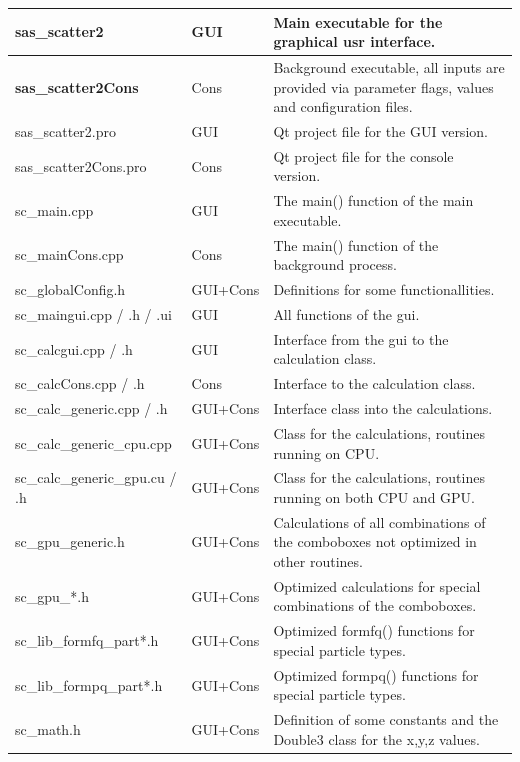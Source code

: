 \documentclass[11pt]{article} %
\begin{document}
\begin{longtable}{|L{4.5cm}|C{1.8cm}|L{10.9cm}|}
\hline
{\bf sas\_scatter2} & {\small GUI} & Main executable for the graphical usr interface. \\ \hline
{\bf sas\_scatter2Cons} & {\small Cons} & Background executable, all inputs are provided via parameter flags, values and configuration files. \\ \hline
sas\_scatter2.pro & {\small GUI} & Qt project file for the GUI version. \\ \hline
sas\_scatter2Cons.pro & {\small Cons} & Qt project file for the console version. \\ \hline
sc\_main.cpp & {\small GUI} & The main() function of the main executable. \\ \hline
sc\_mainCons.cpp & {\small Cons} & The main() function of the background process. \\ \hline
sc\_globalConfig.h & {\small GUI+Cons} & Definitions for some functionallities. \\ \hline
sc\_maingui.cpp / .h / .ui & {\small GUI} & All functions of the gui. \\ \hline
sc\_calcgui.cpp / .h & {\small GUI} & Interface from the gui to the calculation class. \\ \hline
sc\_calcCons.cpp / .h & {\small Cons} & Interface to the calculation class. \\ \hline
sc\_calc\_generic.cpp / .h & {\small GUI+Cons} & Interface class into the calculations. \\ \hline
sc\_calc\_generic\_cpu.cpp & {\small GUI+Cons} & Class for the calculations, routines running on CPU. \\ \hline
sc\_calc\_generic\_gpu.cu / .h & {\small GUI+Cons} & Class for the calculations, routines running on both CPU and GPU. \\ \hline
sc\_gpu\_generic.h & {\small GUI+Cons} & Calculations of all combinations of the comboboxes not optimized in other routines. \\ \hline
sc\_gpu\_*.h & {\small GUI+Cons} & Optimized calculations for special combinations of the comboboxes. \\ \hline
sc\_lib\_formfq\_part*.h & {\small GUI+Cons} & Optimized formfq() functions for special particle types. \\ \hline
sc\_lib\_formpq\_part*.h & {\small GUI+Cons} & Optimized formpq() functions for special particle types. \\ \hline
sc\_math.h & {\small GUI+Cons} & Definition of some constants and the Double3 class for the x,y,z values. \\ \hline

\end{longtable}
\end{document}
